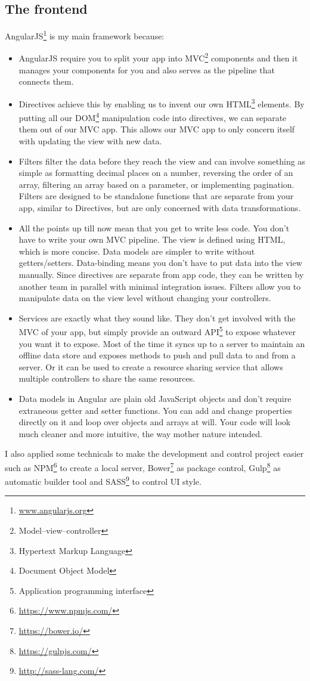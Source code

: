 \documentclass[a4paper,12pt]{article}
\begin{document}
\subsection{The frontend}
AngularJS\footnote{ \url{www.angularjs.org}} is my main framework because:
\begin{itemize}
	\item AngularJS require you to split your app into MVC\footnote{ Model–view–controller} components and then it manages your components for you and also serves as the pipeline that connects them.
	\item Directives achieve this by enabling us to invent our own HTML\footnote{ Hypertext Markup Language} elements. By putting all our DOM\footnote{ Document Object Model} manipulation code into directives, we can separate them out of our MVC app. This allows our MVC app to only concern itself with updating the view with new data.
	\item Filters filter the data before they reach the view and can involve something as simple as formatting decimal places on a number, reversing the order of an array, filtering an array based on a parameter, or implementing pagination. Filters are designed to be standalone functions that are separate from your app, similar to Directives, but are only concerned with data transformations.
	\item All the points up till now mean that you get to write less code. You don’t have to write your own MVC pipeline. The view is defined using HTML, which is more concise. Data models are simpler to write without getters/setters. Data-binding means you don’t have to put data into the view manually. Since directives are separate from app code, they can be written by another team in parallel with minimal integration issues. Filters allow you to manipulate data on the view level without changing your controllers.
	\item Services are exactly what they sound like. They don’t get involved with the MVC of your app, but simply provide an outward API\footnote{ Application programming interface} to expose whatever you want it to expose. Most of the time it syncs up to a server to maintain an offline data store and exposes methods to push and pull data to and from a server. Or it can be used to create a resource sharing service that allows multiple controllers to share the same resources.
	\item Data models in Angular are plain old JavaScript objects and don’t require extraneous getter and setter functions. You can add and change properties directly on it and loop over objects and arrays at will. Your code will look much cleaner and more intuitive, the way mother nature intended.
\end{itemize}
I also applied some technicals to make the development and
control project easier such as NPM\footnote{ \url{https://www.npmjs.com/}} to create a local server, Bower\footnote{ \url{https://bower.io/}} as package control, Gulp\footnote{ \url{https://gulpjs.com/}} as automatic builder tool and SASS\footnote{ \url{http://sass-lang.com/}} to control UI style.
\end{document}
